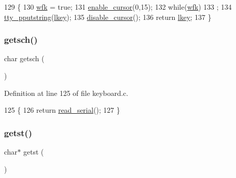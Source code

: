 \begin{DoxyCode}
129              \{
130     \hyperlink{a00038_a6ddd5223379778858edc46ffbec19775_a6ddd5223379778858edc46ffbec19775}{wfk} = \textcolor{keyword}{true};
131     \hyperlink{a00167_afe197dc4dbfa6036ef04abd2aeeeca2d_afe197dc4dbfa6036ef04abd2aeeeca2d}{enable\_cursor}(0,15);
132     \textcolor{keywordflow}{while}(\hyperlink{a00038_a6ddd5223379778858edc46ffbec19775_a6ddd5223379778858edc46ffbec19775}{wfk})
133         ;
134     \hyperlink{a00167_ade960b1320324706aac6c00cc6b1b2fe_ade960b1320324706aac6c00cc6b1b2fe}{tty\_pputstring}(\hyperlink{a00038_ade374650022cb30c4f5591a8dafad685_ade374650022cb30c4f5591a8dafad685}{lkey});
135     \hyperlink{a00167_a3d09038c7b6436e60b228f2f3f451f6a_a3d09038c7b6436e60b228f2f3f451f6a}{disable\_cursor}();
136     \textcolor{keywordflow}{return} \hyperlink{a00038_ade374650022cb30c4f5591a8dafad685_ade374650022cb30c4f5591a8dafad685}{lkey};
137 \}
\end{DoxyCode}
\mbox{\label{a00041_aa7ee03b27a489828ce588d0fc023cab3_aa7ee03b27a489828ce588d0fc023cab3}} 
\subsubsection{\texorpdfstring{getsch()}{getsch()}}
{\footnotesize\ttfamily char getsch (\begin{DoxyParamCaption}{ }\end{DoxyParamCaption})}



Definition at line 125 of file keyboard.\+c.


\begin{DoxyCode}
125               \{
126     \textcolor{keywordflow}{return} \hyperlink{a00050_ad343a7018f74662f794968dfa0523841_ad343a7018f74662f794968dfa0523841}{read\_serial}();
127 \}
\end{DoxyCode}
\mbox{\label{a00041_ab88a2e96bbe585e228a5b201435c0240_ab88a2e96bbe585e228a5b201435c0240}} 
\subsubsection{\texorpdfstring{getst()}{getst()}}
{\footnotesize\ttfamily char$\ast$ getst (\begin{DoxyParamCaption}{ }\end{DoxyParamCaption})}




